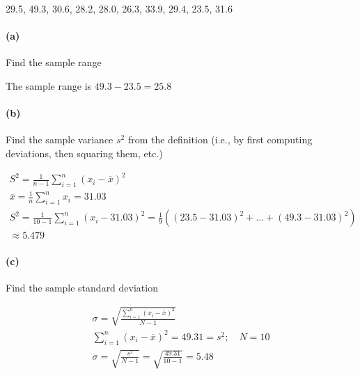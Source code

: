     29.5, 49.3, 30.6, 28.2, 28.0, 26.3, 33.9, 29.4, 23.5, 31.6

    \paragraph*{(a)}
    Find the sample range

    \begin{mdframed}
        The sample range is $49.3 - 23.5 = \boxed{25.8}$
    \end{mdframed}

    \paragraph*{(b)}
    Find the sample variance $s^2$ from the definition (i.e., by first computing deviations, then squaring them, etc.)

    \begin{mdframed}
        \begin{equation*}
            \begin{gathered}
                S^2 = \frac{1}{n-1}\sum_{i=1}^{n}(x_{i}-\overline{x})^2 \\
                \overline{x} = \frac{1}{n}\sum_{i=1}^{n}x_i = 31.03 \\
                S^2 = \frac{1}{10-1}\sum_{i=1}^{n}(x_{i}-31.03)^2 = \frac{1}{9}((23.5 - 31.03)^2 + \dots + (49.3 - 31.03)^2) \\
                \approx \boxed{5.479}
            \end{gathered}
        \end{equation*}
    \end{mdframed}

    \paragraph*{(c)}
    Find the sample standard deviation

    \begin{mdframed}
        \begin{equation*}
            \begin{gathered}
                \sigma = \sqrt{\frac{\sum\limits_{i=1}^{n}(x_i-\overline{x})^2}{N-1}} \\
                \sum_{i=1}^{n}(x_i-\overline{x})^2 = 49.31 = s^2; \quad N = 10 \\
                \sigma = \sqrt{\frac{s^2}{N-1}} = \sqrt{\frac{49.31}{10-1}} = \boxed{5.48}
            \end{gathered}
        \end{equation*}
    \end{mdframed}

